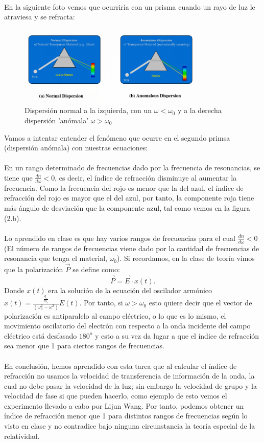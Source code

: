 \documentclass[a4paper]{article}
\begin{document}
\\
En la siguiente foto vemos que ocurriría con un prisma cuando un rayo de luz le atraviesa y se refracta:
\begin{figure}[H]
    \centering
    \includegraphics[width=0.8\textwidth]{prisma.png}
    \caption{Dispersión normal a la izquierda, con un $\omega < \omega_0$ y a la derecha dispersión 'anómala' $\omega > \omega_0$}
    \label{fig:prisma-png}
\end{figure}
Vamos a intentar entender el fenómeno que ocurre en el segundo primsa (dispersión anómala) con nuestras ecuaciones:\\
\\
En un rango determinado de frecuencias dado por la frecuencia de resonancias, se tiene que $\frac{dn}{d\omega} <0$, es decir, el índice de refracción disminuye al aumentar la frecuencia. Como la frecuencia del rojo es menor que la del azul, el índice de refracción del rojo es mayor que el del azul, por tanto, la componente roja tiene más ángulo de desviación que la componente azul, tal como vemos en la figura (2.b). \\
\\

Lo aprendido en clase es que hay varios rangos de frecuencias para el cual $\frac{d n}{d \omega} <0$ (El número de rangos de frecuencias viene dado por la cantidad de frecuencias de resonancia que tenga el material, $\omega_0$). Si recordamos, en la clase de teoría vimos que la polarización $\vec{P}$ se define como:
\[
    \vec{P}= \vec{E}\cdot x\left( t \right)     
.\] 
Donde $x\left( t \right) $ era la solución de la ecuación del oscilador armónico $x\left( t \right) = \frac{\frac{q_e}{m_e}}{\left( \omega_0^2-\omega^2 \right) } E\left( t \right) $. Por tanto, si $\omega> \omega_0$ esto quiere decir que el vector de polarización es antiparalelo al campo eléctrico, o lo que es lo mismo, el movimiento oscilatorio del electrón con respecto a la onda incidente del campo eléctrico está desfasado $180^o$ y esto a su vez da lugar a que el índice de refracción sea menor que 1 para ciertos rangos de frecuencias. \\
\\
En conclusión, hemos aprendido con esta tarea que al calcular el índice de refracción no usamos la velocidad de transferencia de información de la onda, la cual no debe pasar la velocidad de la luz; sin embargo la velocidad de grupo y la velocidad de fase si que pueden hacerlo, como ejemplo de esto vemos el experimento llevado a cabo por Lijun Wang. Por tanto, podemos obtener un índice de refracción menor que 1 para distintos rangos de frecuencias según lo visto en clase y no contradice bajo ninguna circunstancia la teoría especial de la relatividad.
\end{document}
